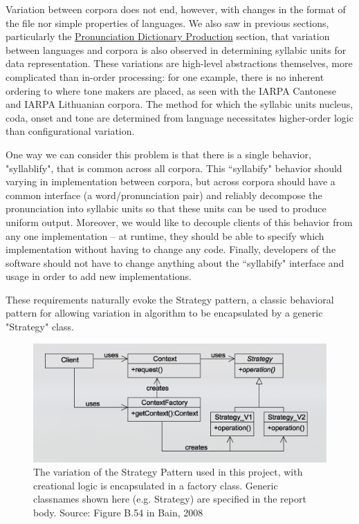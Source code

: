 \documentclass[11pt]{article}
\begin{document}
Variation between corpora does not end, however, with changes in the format of the file nor simple properties of languages. We also saw in previous sections, particularly the \hyperlink{section.24}{Pronunciation Dictionary Production} section, that variation between languages and corpora is also observed in determining syllabic units for data representation. These variations are high-level abstractions themselves, more complicated than in-order processing: for one example, there is no inherent ordering to where tone makers are placed, as seen with the IARPA Cantonese and IARPA Lithuanian corpora. The method for which the syllabic units nucleus, coda, onset and tone are determined from language necessitates higher-order logic than configurational variation.

One way we can consider this problem is that there is a single behavior, "syllablify", that is common across all corpora. This ``syllabify" behavior should varying in implementation between corpora, but across corpora should have a common interface (a word/pronunciation pair) and reliably decompose the pronunciation into syllabic units so that these units can be used to produce uniform output. Moreover, we would like to decouple clients of this behavior from any one implementation -- at runtime, they should be able to specify which implementation without having to change any code. Finally, developers of the software should not have to change anything about the ``syllabify" interface and usage in order to add new implementations. 

These requirements naturally evoke the Strategy pattern\cite{freeman_head_2004}, a classic behavioral pattern for allowing variation in algorithm to be encapsulated by a generic "Strategy" class.

\begin{figure}[h]
\centering
\includegraphics[scale=0.5]{strategy-pattern.png}
\caption{The variation of the Strategy Pattern used in this project, with creational logic is encapsulated in a factory class. Generic classnames shown here (e.g. Strategy) are specified in the report body. Source: Figure B.54 in Bain, 2008\cite{bain_emergent_2008}}
\label{fig:strategy-pattern}
\end{figure}
\end{document}
